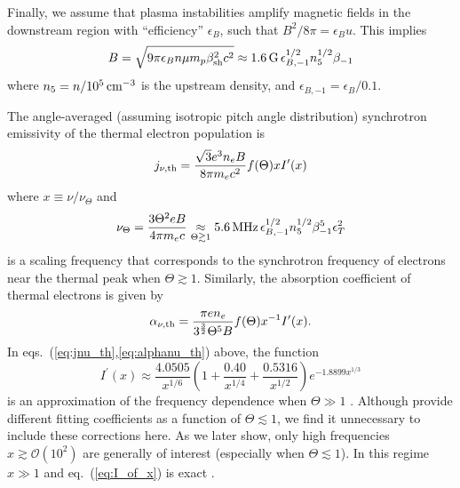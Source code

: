 \documentclass[twocolumn]{aastex63}
\begin{document}
Finally, we assume that plasma instabilities amplify magnetic fields in the downstream region with ``efficiency'' $\epsilon_B$, such that $B^2/8\pi = \epsilon_B u$. This implies
\begin{equation}
\label{eq:B}
    B = \sqrt{9\pi \epsilon_B n \mu m_p \beta_{\rm sh}^2 c^2}
    \approx 1.6 \,{\rm G}\,\epsilon_{B,-1}^{1/2} n_5^{1/2} \beta_{-1}
\end{equation}
where $n_5 = n/10^5\,{\rm cm}^{-3}$ is the upstream density, and $\epsilon_{B,-1} = \epsilon_B/0.1$.

The angle-averaged (assuming isotropic pitch angle distribution) synchrotron emissivity of the thermal electron population is 
\begin{equation}
\label{eq:jnu_th}
    j_{\nu,{\rm th}} = \frac{\sqrt{3} e^3 n_e B}{8\pi m_e c^2} f(\Theta) x I^\prime(x)
\end{equation}
where
$x \equiv {\nu}/{\nu_\Theta}$ and
\begin{equation}
\label{eq:nu_Theta}
    \nu_\Theta = \frac{3\Theta^2 e B}{4\pi m_e c}
    \underset{\Theta \gtrsim 1}{\approx} 
    5.6\,{\rm MHz}\,\epsilon_{B,-1}^{1/2} n_5^{1/2} \beta_{-1}^5 \epsilon_T^2
\end{equation}
is a scaling frequency that corresponds to the synchrotron frequency of electrons near the thermal peak when $\Theta \gtrsim 1$. 
Similarly, the absorption coefficient of thermal electrons is given by
\begin{equation}
\label{eq:alphanu_th}
    \alpha_{\nu,{\rm th}} = \frac{\pi e n_e}{3^\frac{3}{2} \Theta^5 B} f(\Theta) x^{-1} I^\prime(x)
    .
\end{equation}
In eqs.~(\ref{eq:jnu_th},\ref{eq:alphanu_th}) above, the function
\begin{equation}
\label{eq:I_of_x}
    I^\prime(x) \approx \frac{4.0505}{x^{1/6}} \left( 1 + \frac{0.40}{x^{1/4}} + \frac{0.5316}{x^{1/2}} \right) e^{-1.8899 x^{1/3}}
\end{equation}
is an approximation of the frequency dependence when $\Theta \gg 1$ \citep{Mahadevan+96}.
Although \cite{Mahadevan+96} provide different fitting coefficients as a function of $\Theta \lesssim 1$, we find it unnecessary to include these corrections here. As we later show, only high frequencies $x \gtrsim \mathcal{O}(10^2)$ are generally of interest (especially when $\Theta \lesssim 1$). In this regime $x \gg 1$ and eq.~(\ref{eq:I_of_x}) is exact \citep{Petrosian81}.
\end{document}
